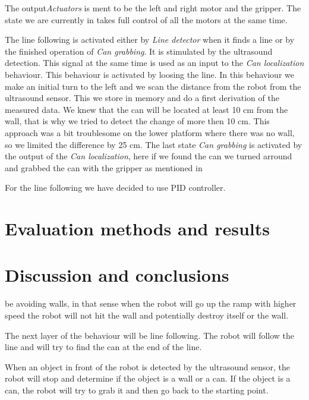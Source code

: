 \documentclass{article}
\begin{document}
The output\textit{Actuators} is ment to be the left and right motor and the gripper. The state we are currently in takes
full control of all the motors at the same time.

The line following is activated either by \textit{Line detector} when it finds a line or by the finished operation
of \textit{Can grabbing}. It is stimulated by the ultrasound detection. This signal at the same time is used as an
input to the \textit{Can localization} behaviour. This behaviour is activated by loosing the line. In this behaviour
we make an initial turn to the left and we scan the distance from the robot from the ultrasound sensor. This we store
in memory and do a first derivation of the measured data. We knew that the can will be located at least 10 cm from the
wall, that is why we tried to detect the change of more then 10 cm. This approach was a bit troublesome on the lower
platform where there was no wall, so we limited the difference by 25 cm. The last state \textit{Can grabbing} is activated
by the output of the \textit{Can localization}, here if we found the can we turned arround and grabbed the can with
the gripper as mentioned in%

\label{subsubsec:pid}

For the line following we have decided to use PID controller.

\section{Evaluation methods and results}
\label{sec:evaluation_methods_and_results}



\section{Discussion and conclusions}
\label{sec:discussion_and_conclusions}



be avoiding walls, in that sense when the robot will go up the ramp with higher speed the robot will not hit the wall and
potentially destroy itself or the wall.

The next layer of the behaviour will be line following. The robot will follow the line and will try to find the can at
the end of the line.

When an object in front of the robot is detected by the ultrasound sensor, the robot will stop and determine if the
object is a wall or a can. If the object is a can, the robot will try to grab it and then go back to the starting point.
\end{document}

